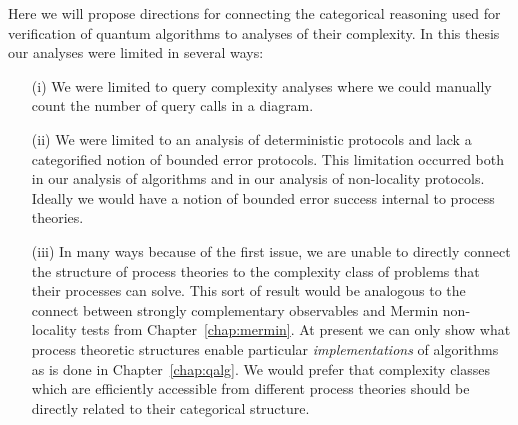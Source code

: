 Here we will propose directions for connecting the categorical reasoning used for verification of quantum algorithms to analyses of their complexity. In this thesis our analyses were limited in several ways: 
\begin{enumerate}
\item[(i)] We were limited to query complexity analyses where we could manually count the number of query calls in a diagram. 
\item[(ii)] We were limited to an analysis of deterministic protocols and lack a categorified notion of bounded error protocols. This limitation occurred both in our analysis of algorithms and in our analysis of non-locality protocols. Ideally we would have a notion of bounded error success internal to process theories.
\item[(iii)] In many ways because of the first issue, we are unable to directly connect the structure of process theories to the complexity class of problems that their processes can solve. This sort of result would be analogous to the connect between strongly complementary observables and Mermin non-locality tests from Chapter~\ref{chap:mermin}. At present we can only show what process theoretic structures enable particular \emph{implementations} of algorithms as is done in Chapter~\ref{chap:qalg}. We would prefer that complexity classes which are efficiently accessible from different  process theories should be directly related to their categorical structure.
\end{enumerate}


